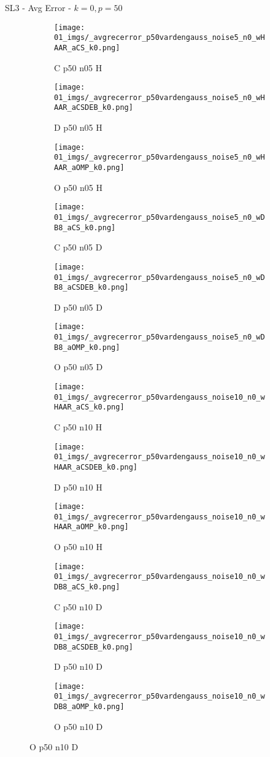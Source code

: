 \begin{frame}{SL3 - Avg Error - $k=0,p=50$}{}
\begin{figure}
\begin{subfigure}{0.13\textwidth}
\texttt{[image: 01\_imgs/\_avgrecerror\_p50vardengauss\_noise5\_n0\_wHAAR\_aCS\_k0.png]}
\caption*{\tiny C p50 n05 H}
\end{subfigure}
\begin{subfigure}{0.13\textwidth}
\texttt{[image: 01\_imgs/\_avgrecerror\_p50vardengauss\_noise5\_n0\_wHAAR\_aCSDEB\_k0.png]}
\caption*{\tiny D p50 n05 H}
\end{subfigure}
\begin{subfigure}{0.13\textwidth}
\texttt{[image: 01\_imgs/\_avgrecerror\_p50vardengauss\_noise5\_n0\_wHAAR\_aOMP\_k0.png]}
\caption*{\tiny O p50 n05 H}
\end{subfigure}
\begin{subfigure}{0.13\textwidth}
\texttt{[image: 01\_imgs/\_avgrecerror\_p50vardengauss\_noise5\_n0\_wDB8\_aCS\_k0.png]}
\caption*{\tiny C p50 n05 D}
\end{subfigure}
\begin{subfigure}{0.13\textwidth}
\texttt{[image: 01\_imgs/\_avgrecerror\_p50vardengauss\_noise5\_n0\_wDB8\_aCSDEB\_k0.png]}
\caption*{\tiny D p50 n05 D}
\end{subfigure}
\begin{subfigure}{0.13\textwidth}
\texttt{[image: 01\_imgs/\_avgrecerror\_p50vardengauss\_noise5\_n0\_wDB8\_aOMP\_k0.png]}
\caption*{\tiny O p50 n05 D}
\end{subfigure}

\vspace{5pt}

\begin{subfigure}{0.13\textwidth}
\texttt{[image: 01\_imgs/\_avgrecerror\_p50vardengauss\_noise10\_n0\_wHAAR\_aCS\_k0.png]}
\caption*{\tiny C p50 n10 H}
\end{subfigure}
\begin{subfigure}{0.13\textwidth}
\texttt{[image: 01\_imgs/\_avgrecerror\_p50vardengauss\_noise10\_n0\_wHAAR\_aCSDEB\_k0.png]}
\caption*{\tiny D p50 n10 H}
\end{subfigure}
\begin{subfigure}{0.13\textwidth}
\texttt{[image: 01\_imgs/\_avgrecerror\_p50vardengauss\_noise10\_n0\_wHAAR\_aOMP\_k0.png]}
\caption*{\tiny O p50 n10 H}
\end{subfigure}
\begin{subfigure}{0.13\textwidth}
\texttt{[image: 01\_imgs/\_avgrecerror\_p50vardengauss\_noise10\_n0\_wDB8\_aCS\_k0.png]}
\caption*{\tiny C p50 n10 D}
\end{subfigure}
\begin{subfigure}{0.13\textwidth}
\texttt{[image: 01\_imgs/\_avgrecerror\_p50vardengauss\_noise10\_n0\_wDB8\_aCSDEB\_k0.png]}
\caption*{\tiny D p50 n10 D}
\end{subfigure}
\begin{subfigure}{0.13\textwidth}
\texttt{[image: 01\_imgs/\_avgrecerror\_p50vardengauss\_noise10\_n0\_wDB8\_aOMP\_k0.png]}
\caption*{\tiny O p50 n10 D}
\end{subfigure}


\end{figure}
\end{frame}
